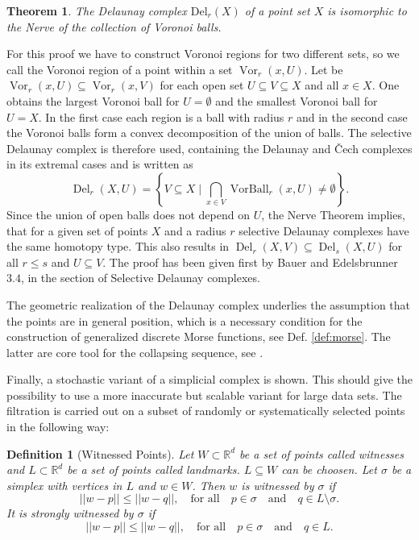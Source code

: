 \documentclass[journal]{IEEEtran}
\DeclareMathOperator{\VorBall}{VorBall}
\DeclareMathOperator{\Vor}{Vor}
\DeclareMathOperator{\Del}{Del}
\newtheorem{theorem}{Theorem}[section]
\newtheorem{definition}{Definition}[section]
\begin{document}
\begin{theorem}
The Delaunay complex $\text{Del}_r(X)$ of a point set $X$ is isomorphic to the Nerve of the collection of Voronoi balls.
\end{theorem}
\begin{IEEEproof} For this proof we have to construct Voronoi regions for two different sets, so we call the Voronoi region of a point within a set $\Vor_r(x,U)$. Let be $\Vor_r(x,U) \subseteq \Vor_r(x,V)$ for each open set $U \subseteq V \subseteq X$ and all $x \in X$. One obtains the largest Voronoi ball for $U = \emptyset$ and the smallest Voronoi ball for $U = X$. In the first case each region is a ball with radius $r$ and in the second case the Voronoi balls form a convex decomposition of the union of balls. The selective Delaunay complex is therefore used, containing the Delaunay and \v{C}ech complexes in its extremal cases and is written as
\[
\Del_r(X,U) = \left\{V \subseteq X \; \bigg\vert \; \bigcap_{x \in V} \VorBall_r(x,U) \neq \emptyset \right\}.
\]
Since the union of open balls does not depend on $U$, the Nerve Theorem implies, that for a given set of points $X$ and a radius $r$ selective Delaunay complexes have the same homotopy type. This also results in $\Del_r(X,V) \subseteq \Del_s(X,U)$ for all $r \leq s$ and $U \subseteq V$. The proof has been given first by Bauer and Edelsbrunner \cite{bauer2017morse} $3.4$, in the section of Selective Delaunay complexes.
\end{IEEEproof}

The geometric realization of the Delaunay complex underlies the assumption that the points are in general position, which is a necessary condition for the construction of generalized discrete Morse functions, see Def. \ref{def:morse}. The latter are core tool for the collapsing sequence, see \cite{bauer2017morse}.

Finally, a stochastic variant of a simplicial complex is shown. This should give the possibility to use a more inaccurate but scalable variant for large data sets. The filtration is carried out on a subset of randomly or systematically selected points in the following way:

\begin{definition}[Witnessed Points]
Let $W \subset \mathbb{R}^d$ be a set of points called witnesses and $L \subset \mathbb{R}^d$ be a set of points called landmarks. $L \subseteq W$ can be choosen. Let $\sigma$ be a simplex with vertices in $L$ and $w \in W$. Then $w$ is witnessed by $\sigma$ if
\[
  ||w-p|| \leq ||w-q||, \quad \text{for all} \quad p \in \sigma \quad \text{and} \quad q \in L \setminus \sigma.
\] It is strongly witnessed by $\sigma$ if
\[
  ||w-p|| \leq ||w-q||, \quad \text{for all} \quad p \in \sigma \quad \text{and} \quad q \in L.
\]
\end{definition}
\end{document}
